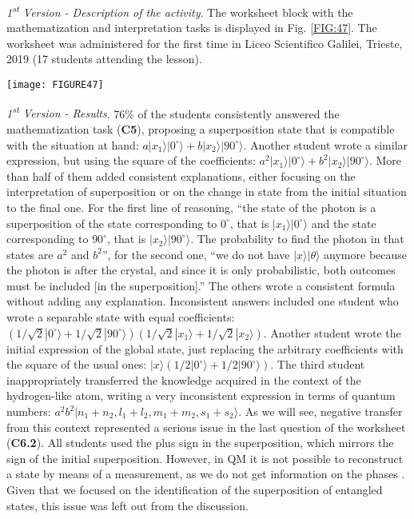 \documentclass[twocolumn,secnumarabic,amssymb, nobibnotes, aps, prd, nofootinbib]{revtex4-2}
\begin{document}
\emph{1\textsuperscript{st} Version - Description of the activity}. The worksheet block with the mathematization and interpretation tasks is displayed in Fig. \ref{FIG:47}. The worksheet was administered for the first time in Liceo Scientifico Galilei, Trieste, 2019 (17 students attending the lesson).
\begin{figure*}[!htpb]
       \texttt{[image: FIGURE47]}
    \caption{Worksheet block on the derivation and interpretation of entangled superposition: Liceo Galilei, Trieste, 2019}
    \label{FIG:47}
\end{figure*}

\emph{1\textsuperscript{st} Version - Results}. 76\% of the students consistently answered the mathematization task (\textbf{C5}), proposing a superposition state that is compatible with the situation at hand: $a|x_1\rangle|0^{\circ}\rangle+b|x_2\rangle|90^{\circ}\rangle$. Another student wrote a similar expression, but using the square of the coefficients: $a^2|x_1\rangle|0^{\circ}\rangle+b^2|x_2\rangle|90^{\circ}\rangle$. More than half of them added consistent explanations, either focusing on the interpretation of superposition or on the change in state from the initial situation to the final one. For the first line of reasoning, ``the state of the photon is a superposition of the state corresponding to $0^{\circ}$, that is $|x_1\rangle|0^{\circ}\rangle$ and the state corresponding to $90^{\circ}$, that is $|x_2\rangle|90^{\circ}\rangle$. The probability to find the photon in that states are $a^2$ and $b^2$'', for the second one, ``we do not have $|x\rangle|\theta\rangle$ anymore because the photon is after the crystal, and since it is only probabilistic, both outcomes must be included [in the superposition].'' The others wrote a consistent formula without adding any explanation. Inconsistent answers included one student who wrote a separable state with equal coefficients: $(1/\sqrt{2}|0^{\circ}\rangle+1/\sqrt{2}|90^{\circ}\rangle)(1/\sqrt{2}|x_1\rangle+1/\sqrt{2}|x_2\rangle)$.
Another student wrote the initial expression of the global state, just replacing the arbitrary coefficients with the square of the usual ones: $|x\rangle (1/2|0^{\circ}\rangle+1/2|90^{\circ}\rangle)$. The third student inappropriately transferred the knowledge acquired in the context of the hydrogen-like atom, writing a very inconsistent expression in terms of quantum numbers: $a^2b^2|n_1+n_2, l_1+l_2, m_1+m_2, s_1+s_2\rangle$. As we will see, negative transfer from this context represented a serious issue in the last question of the worksheet (\textbf{C6.2}). All students used the plus sign in the superposition, which mirrors the sign of the initial superposition. However, in QM it is not possible to reconstruct a state by means of a measurement, as we do not get information on the phases \cite{Michelini2014}. Given that we focused on the identification of the superposition of entangled states, this issue was left out from the discussion.
\end{document}
